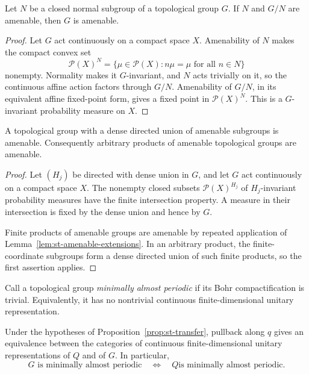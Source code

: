 \begin{lemma}\label{lem:st-amenable-extensions}
 Let $N$ be a closed normal subgroup of a
topological group $G$. If $N$ and $G/N$ are amenable, then $G$ is amenable.
\end{lemma}

\begin{proof}
Let $G$ act continuously on a compact space $X$. Amenability of $N$ makes
the compact convex set 
\begin{equation*}
\mathcal{P}(X)^N=\{\mu\in\mathcal{P}(X):n\mu=\mu\text{ for all }n\in N\} 
\end{equation*}
nonempty. Normality makes it $G$-invariant, and $N$ acts trivially on it, so
the continuous affine action factors through $G/N$. Amenability of $G/N$, in
its equivalent affine fixed-point form, gives a fixed point in $\mathcal{P}(X)^N$. This is a $G$-invariant probability measure on $X$.
\end{proof}

\begin{lemma}\label{lem:st-amenable-products}
 A topological group with a dense directed
union of amenable subgroups is amenable. Consequently arbitrary products of
amenable topological groups are amenable.
\end{lemma}

\begin{proof}
Let $(H_j)$ be directed with dense union in $G$, and let $G$ act
continuously on a compact space $X$. The nonempty closed subsets $\mathcal{P}(X)^{H_j}$ of $H_j$-invariant probability measures have the finite
intersection property. A measure in their intersection is fixed by the dense
union and hence by $G$.

Finite products of amenable groups are amenable by repeated application of
Lemma~\ref{lem:st-amenable-extensions}. In an arbitrary product, the
finite-coordinate subgroups form a dense directed union of such finite
products, so the first assertion applies.
\end{proof}

Call a topological group \emph{minimally almost periodic} if its Bohr
compactification is trivial. Equivalently, it has no nontrivial continuous
finite-dimensional unitary representation.

\begin{corollary}\label{cor:st-finite-dimensional-representations}
 Under the hypotheses of
Proposition~\ref{prop:st-transfer}, pullback along $q$ gives an equivalence
between the categories of continuous finite-dimensional unitary
representations of $Q$ and of $G$. In particular, 
\begin{equation*}
G\text{ is minimally almost periodic}  \quad\Longleftrightarrow\quad  Q\text{
is minimally almost periodic}. 
\end{equation*}
\end{corollary}

